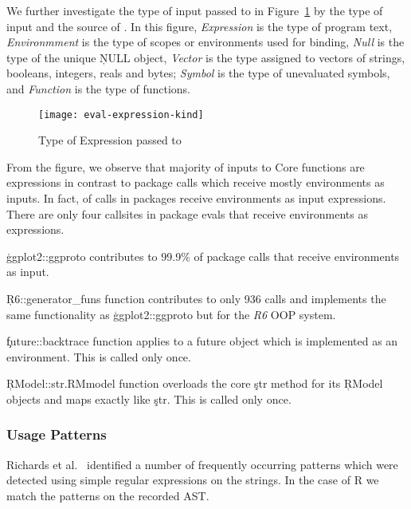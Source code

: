 \documentclass[USenglish,cleveref, autoref, thm-restate]{lipics-v2019}
\begin{document}
We further investigate the type of input passed to \eval in
Figure~\ref{fig:eval-expression-kind} by the type of input and the
source of \eval. In this figure, \emph{Expression} is the type of
program text, \emph{Environmment} is the type of scopes or
environments used for binding, \emph{Null} is the type of the unique
\c{NULL} object, \emph{Vector} is the type assigned to vectors of
strings, booleans, integers, reals and bytes; \emph{Symbol} is the
type of unevaluated symbols, and \emph{Function} is the type of
functions.

\begin{figure}[!h]
  \centering
  \texttt{[image: eval-expression-kind]}
  \caption{Type of Expression passed to \eval} \label{fig:eval-expression-kind}
\end{figure}

From the figure, we observe that majority of inputs to Core \eval
functions are expressions in contrast to package \eval calls which
receive mostly environments as inputs. In fact,
\PackageEnvironmentInputEvalCallPerc of \eval calls in packages
receive environments as input expressions. There are only four
callsites in package evals that receive environments as expressions.
\begin{compactitem}[$-$]
\item \c{ggplot2::ggproto} contributes to 99.9\% of package \eval
  calls that receive environments as input.
\item \c{R6::generator_funs} function contributes to only 936 \eval
  calls and implements the same functionality as \c{ggplot2::ggproto}
  but for the \emph{R6} OOP system.
\item \c{future::backtrace} function applies \eval to a future object
  which is implemented as an environment. This is called only once.
\item \c{RModel::str.RMmodel} function overloads the core \c{str}
  method for its \c{RModel} objects and maps \eval exactly like
  \c{str}. This is called only once.
\end{compactitem}

\subsubsection{Usage Patterns}

Richards et al.~\cite{ecoop11} identified a number of frequently
occurring \eval patterns which were detected using simple regular
expressions on the \eval strings. In the case of R we match the
patterns on the recorded AST.
\end{document}
